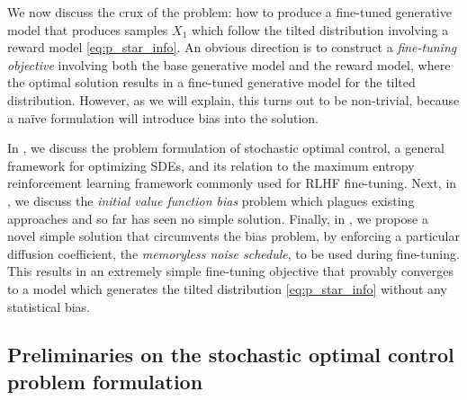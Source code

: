 \documentclass[]{fairmeta}
\begin{document}
We now discuss the crux of the problem: how to produce a fine-tuned generative model that produces samples $X_1$ which follow the tilted distribution involving a reward model \eqref{eq:p_star_info}. 
An obvious direction is to construct a \emph{fine-tuning objective} involving both the base generative model and the reward model, where the optimal solution results in a fine-tuned generative model for the tilted distribution. 
However, as we will explain, this turns out to be non-trivial, because a na\"ive formulation will introduce bias into the solution.

In , we discuss the problem formulation of stochastic optimal control, a general framework for optimizing SDEs, and its relation to the maximum entropy reinforcement learning framework commonly used for RLHF fine-tuning. 
Next, in , we discuss the \emph{initial value function bias} problem which plagues existing approaches and so far has seen no simple solution.
Finally, in , we propose a novel simple solution that circumvents the bias problem, by enforcing a particular diffusion coefficient, the \emph{memoryless noise schedule}, to be used during fine-tuning. This results in an extremely simple fine-tuning objective that provably converges to a model which generates the tilted distribution \eqref{eq:p_star_info} without any statistical bias.


\subsection{Preliminaries on the stochastic optimal control problem formulation} \label{sec:SOC_formulation}
\end{document}
